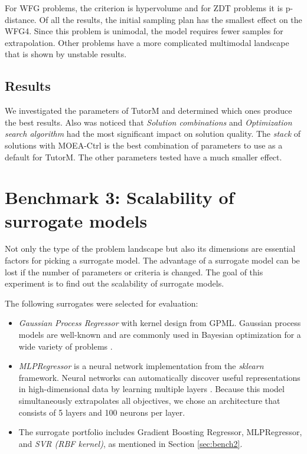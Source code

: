     
    For WFG problems, the criterion is hypervolume and for ZDT problems it is p-distance. Of all the results, the initial sampling plan has the smallest effect on the WFG4. Since this problem is unimodal, the model requires fewer samples for extrapolation. Other problems have a more complicated multimodal landscape that is shown by unstable results. 


    \subsection*{Results}
    We investigated the parameters of TutorM and determined which ones produce the best results. Also was noticed that \emph{Solution combinations} and \emph{Optimization search algorithm} had the most significant impact on solution quality. The \emph{stack} of solutions with MOEA-Ctrl is the best combination of parameters to use as a default for TutorM. 
    The other parameters tested have a much smaller effect.


\section{Benchmark 3: Scalability of surrogate models}
    Not only the type of the problem landscape but also its dimensions are essential factors for picking a surrogate model. The advantage of a surrogate model can be lost if the number of parameters or criteria is changed. The goal of this experiment is to find out the scalability of surrogate models.  

    The following surrogates were selected for evaluation:
    \begin{itemize}
        \item \emph{Gaussian Process Regressor} with kernel design from GPML\cite{RasmussenN10}. Gaussian process models are well-known and are commonly used in Bayesian optimization for a wide variety of problems \cite{EmmerichGN06, MlakarPTF15}. 
        \item \emph{MLPRegressor} is a neural network implementation from the \textit{sklearn} framework. Neural networks can automatically discover useful representations in high-dimensional data by learning multiple layers \cite{WilsonHSX16}. Because this model simultaneously extrapolates all objectives, we chose an architecture that consists of 5 layers and 100 neurons per layer.
        \item The surrogate portfolio includes Gradient Boosting Regressor, MLPRegressor, and \emph{SVR (RBF kernel)}, as mentioned in Section \ref{sec:bench2}.
    \end{itemize}

